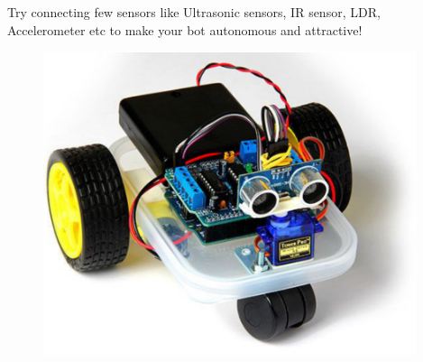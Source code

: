Try connecting few sensors like Ultrasonic sensors, \ac{IR} sensor, \ac{LDR}, Accelerometer etc to make your bot autonomous and attractive!
\begin{figure}
    \centering
    \includegraphics[width=4.3in]{Images/Motor_Driver/sensor_bot.png}
\end{figure}